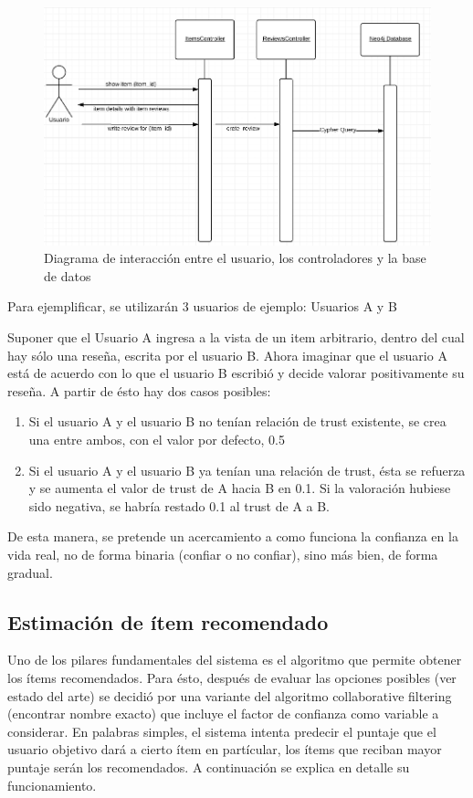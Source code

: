 \begin{figure}[hbtp]
\centering
\includegraphics[scale=0.8]{images/review_history.png}
\caption{Diagrama de interacción entre el usuario, los controladores y la base de datos}
\end{figure}

Para ejemplificar, se utilizarán 3 usuarios de ejemplo: Usuarios A y B

Suponer que el Usuario A ingresa a la vista de un item arbitrario, dentro del cual hay sólo una reseña, escrita por el usuario B. Ahora imaginar que el usuario A está de acuerdo con lo que el usuario B escribió y decide valorar positivamente su reseña. A partir de ésto hay dos casos posibles:

\begin{enumerate}
\item{Si el usuario A y el usuario B no tenían relación de trust existente, se crea una entre ambos, con el valor por defecto, 0.5}
\item{Si el usuario A y el usuario B ya tenían una relación de trust, ésta se refuerza y se aumenta el valor de trust de A hacia B en 0.1. Si la valoración hubiese sido negativa, se habría restado 0.1 al trust de A a B.}
\end{enumerate}

De esta manera, se pretende un acercamiento a como funciona la confianza en la vida real, no de forma binaria (confiar o no confiar), sino más bien, de forma gradual. 

\subsection{Estimación de ítem recomendado}

Uno de los pilares fundamentales del sistema es el algoritmo que permite obtener los ítems recomendados. Para ésto, después de evaluar las opciones posibles (ver estado del arte) se decidió por una variante del algoritmo collaborative filtering (encontrar nombre exacto) que incluye el factor de confianza como variable a considerar. En palabras simples, el sistema intenta predecir el puntaje que el usuario objetivo dará a cierto ítem en partícular, los ítems que reciban mayor puntaje serán los recomendados. A continuación se explica en detalle su funcionamiento.



